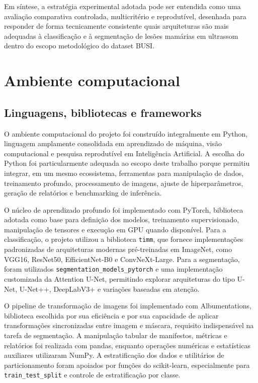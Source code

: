 \documentclass[tcc,capa]{texufpel}
\begin{document}
Em síntese, a estratégia experimental adotada pode ser entendida como uma avaliação comparativa controlada, multicritério e reprodutível, desenhada para responder de forma tecnicamente consistente quais arquiteturas são mais adequadas à classificação e à segmentação de lesões mamárias em ultrassom dentro do escopo metodológico do dataset BUSI.

\section{Ambiente computacional}

\subsection{Linguagens, bibliotecas e frameworks}

O ambiente computacional do projeto foi construído integralmente em Python, linguagem amplamente consolidada em aprendizado de máquina, visão computacional e pesquisa reprodutível em Inteligência Artificial. A escolha do Python foi particularmente adequada ao escopo deste trabalho porque permitiu integrar, em um mesmo ecossistema, ferramentas para manipulação de dados, treinamento profundo, processamento de imagens, ajuste de hiperparâmetros, geração de relatórios e benchmarking de inferência.

O núcleo de aprendizado profundo foi implementado com PyTorch, biblioteca adotada como base para definição dos modelos, treinamento supervisionado, manipulação de tensores e execução em GPU quando disponível. Para a classificação, o projeto utilizou a biblioteca \texttt{timm}, que fornece implementações padronizadas de arquiteturas modernas pré-treinadas em ImageNet, como VGG16, ResNet50, EfficientNet-B0 e ConvNeXt-Large. Para a segmentação, foram utilizados \texttt{segmentation\_models\_pytorch} e uma implementação customizada da Attention U-Net, permitindo explorar arquiteturas do tipo U-Net, U-Net++, DeepLabV3+ e variações baseadas em atenção.

O pipeline de transformação de imagens foi implementado com Albumentations, biblioteca escolhida por sua eficiência e por sua capacidade de aplicar transformações sincronizadas entre imagem e máscara, requisito indispensável na tarefa de segmentação. A manipulação tabular de manifestos, métricas e relatórios foi realizada com pandas, enquanto operações numéricas e estatísticas auxiliares utilizaram NumPy. A estratificação dos dados e utilitários de particionamento foram apoiados por funções do scikit-learn, especialmente para \texttt{train\_test\_split} e controle de estratificação por classe.
\end{document}
